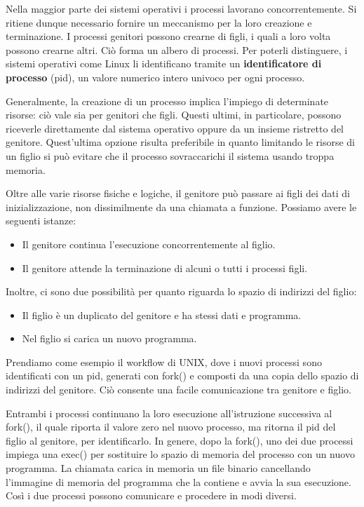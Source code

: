 \noindent Nella maggior parte dei sistemi operativi i processi lavorano concorrentemente. Si ritiene dunque necessario fornire un meccanismo per la loro creazione e terminazione. I processi genitori possono crearne di figli, i quali a loro volta possono crearne altri. Ciò forma un albero di processi. Per poterli distinguere, i sistemi operativi come Linux li identificano tramite un \textbf{identificatore di processo} (pid), un valore numerico intero univoco per ogni processo.\par
\noindent Generalmente, la creazione di un processo implica l'impiego di determinate risorse: ciò vale sia per genitori che figli. Questi ultimi, in particolare, possono riceverle direttamente dal sistema operativo oppure da un insieme ristretto del genitore. Quest'ultima opzione risulta preferibile in quanto limitando le risorse di un figlio si può evitare che il processo sovraccarichi il sistema usando troppa memoria.\par
Oltre alle varie risorse fisiche e logiche, il genitore può passare ai figli dei dati di inizializzazione, non dissimilmente da una chiamata a funzione. Possiamo avere le seguenti istanze: \begin{itemize}
	\item Il genitore continua l'esecuzione concorrentemente al figlio.
	\item Il genitore attende la terminazione di alcuni o tutti i processi figli.
\end{itemize}
\noindent Inoltre, ci sono due possibilità per quanto riguarda lo spazio di indirizzi del figlio: \begin{itemize}
	\item Il figlio è un duplicato del genitore e ha stessi dati e programma.
	\item Nel figlio si carica un nuovo programma.
\end{itemize}
\noindent Prendiamo come esempio il workflow di UNIX, dove i nuovi processi sono identificati con un pid, generati con fork() e composti da una copia dello spazio di indirizzi del genitore. Ciò consente una facile comunicazione tra genitore e figlio.\par
Entrambi i processi continuano la loro esecuzione all'istruzione successiva al fork(), il quale riporta il valore zero nel nuovo processo, ma ritorna il pid del figlio al genitore, per identificarlo. In genere, dopo la fork(), uno dei due processi impiega una exec() per sostituire lo spazio di memoria del processo con un nuovo programma. La chiamata carica in memoria un file binario cancellando l'immagine di memoria del programma che la contiene e avvia la sua esecuzione. Così i due processi possono comunicare e procedere in modi diversi.\par
